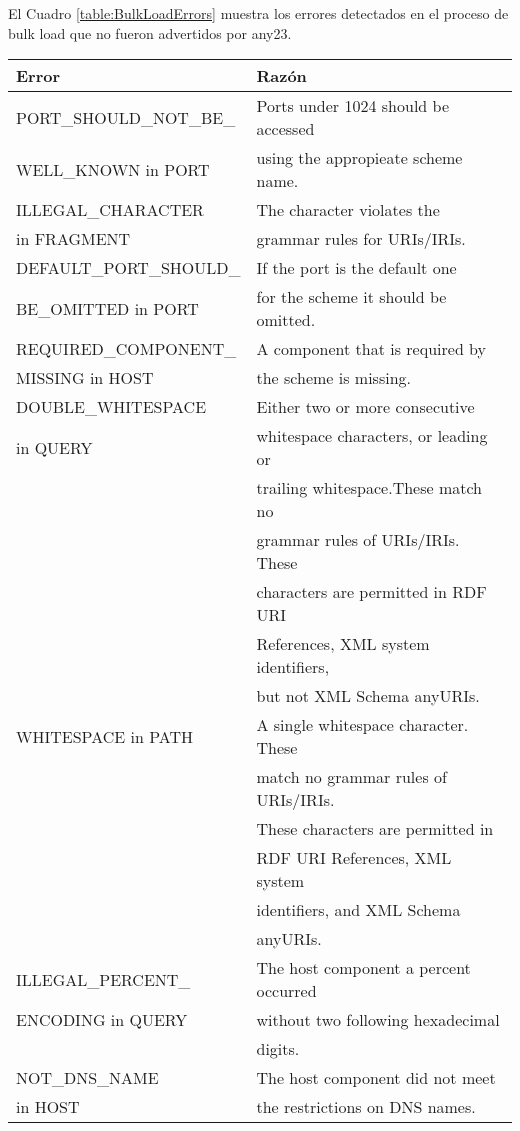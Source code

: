 El Cuadro \ref{table:BulkLoadErrors} muestra los errores detectados en el proceso de bulk load que no fueron advertidos por any23.\\
\begin{table}[h]
\begin{tabular}{| l | l | }\hline
Error & Razón \\\hline
PORT\_SHOULD\_NOT\_BE\_& Ports under 1024 should be accessed \\ WELL\_KNOWN  in PORT  & using the appropieate scheme name. \\\hline
ILLEGAL\_CHARACTER & The character violates the \\  in FRAGMENT & grammar rules for URIs/IRIs.\\\hline
DEFAULT\_PORT\_SHOULD\_& If the port is the default one \\ BE\_OMITTED in PORT  & for the scheme it should be omitted. \\\hline
REQUIRED\_COMPONENT\_& A component that is required by \\ MISSING in HOST & the scheme is missing.\\\hline
DOUBLE\_WHITESPACE& Either two or more consecutive \\  in QUERY  &  whitespace characters, or leading or \\ & trailing whitespace.These match no \\ & grammar rules  of URIs/IRIs. These \\ &  characters are  permitted in RDF URI \\ &  References, XML  system identifiers,\\ & but not XML Schema  anyURIs.\\\hline
WHITESPACE in PATH & A single whitespace character. These \\ &  match no grammar rules of URIs/IRIs. \\ &  These characters are permitted in \\ & RDF URI References, XML system \\ & identifiers, and XML Schema \\ & anyURIs.\\\hline
ILLEGAL\_PERCENT\_& The host component a percent occurred \\ ENCODING in QUERY  & without two following hexadecimal \\ & digits.\\\hline
NOT\_DNS\_NAME& The host component did not meet \\  in HOST  & the restrictions on DNS names.\\\hline

\end{tabular}
\end{table}

